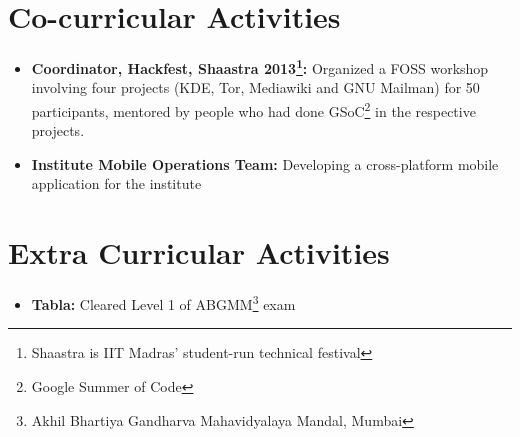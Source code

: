 \documentclass[letterpaper,11pt]{resume}
\begin{document}
\section{Co-curricular Activities}
\begin{itemize}
  \item {\bf Coordinator, Hackfest, Shaastra 2013\footnote{Shaastra is IIT Madras' student-run technical festival}: } Organized a FOSS workshop involving four projects (KDE, Tor, Mediawiki and GNU Mailman) for 50 participants, mentored by people who had done GSoC\footnote{Google Summer of Code} in the respective projects.
  \end{itemize} 
   \begin{itemize}
  \item {\bf Institute Mobile Operations Team:} Developing a cross-platform mobile application for the institute
  \end{itemize} 
\section{Extra Curricular Activities}
\begin{itemize}
 \item {\bf Tabla:} Cleared Level 1 of ABGMM\footnote{Akhil Bhartiya Gandharva Mahavidyalaya Mandal, Mumbai} exam
\end{itemize}
\end{document}
